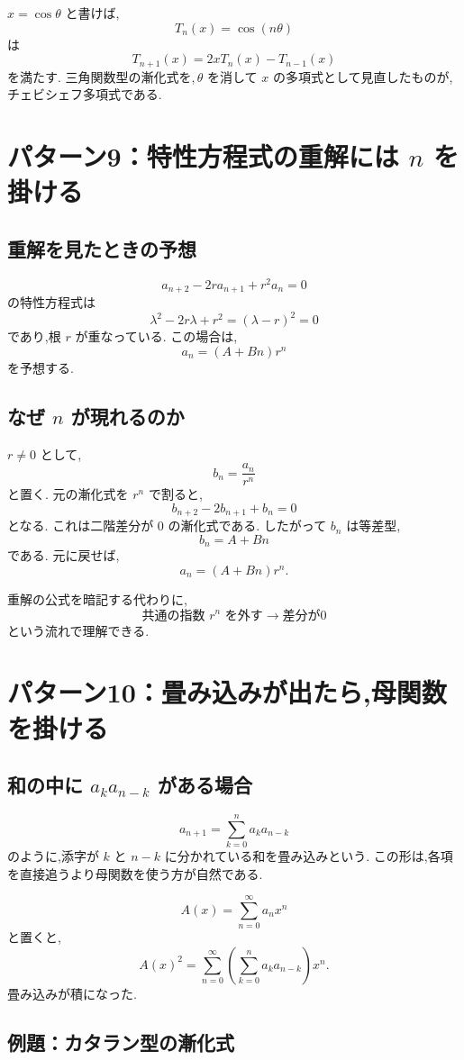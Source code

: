 $x=\cos\theta$ と書けば,
\[
  T_n(x)=\cos(n\theta)
\]
は
\[
  T_{n+1}(x)=2xT_n(x)-T_{n-1}(x)
\]
を満たす.
三角関数型の漸化式を,\,$\theta$ を消して $x$ の多項式として見直したものが,
チェビシェフ多項式である.

\section{パターン9：特性方程式の重解には $n$ を掛ける}

\subsection{重解を見たときの予想}

\[
  a_{n+2}-2r a_{n+1}+r^2a_n=0
\]
の特性方程式は
\[
  \lambda^2-2r\lambda+r^2=(\lambda-r)^2=0
\]
であり,根 $r$ が重なっている.
この場合は,
\[
  a_n=(A+Bn)r^n
\]
を予想する.

\subsection{なぜ $n$ が現れるのか}

$r\neq0$ として,
\[
  b_n=\frac{a_n}{r^n}
\]
と置く.
元の漸化式を $r^{n}$ で割ると,
\[
  b_{n+2}-2b_{n+1}+b_n=0
\]
となる.
これは二階差分が $0$ の漸化式である.
したがって $b_n$ は等差型,
\[
  b_n=A+Bn
\]
である.
元に戻せば,
\[
  a_n=(A+Bn)r^n.
\]

重解の公式を暗記する代わりに,
\[
  \text{共通の指数 }r^n\text{ を外す}
  \longrightarrow
  \text{差分が0}
\]
という流れで理解できる.

\section{パターン10：畳み込みが出たら,母関数を掛ける}

\subsection{和の中に $a_ka_{n-k}$ がある場合}

\[
  a_{n+1}=\sum_{k=0}^{n}a_ka_{n-k}
\]
のように,添字が $k$ と $n-k$ に分かれている和を畳み込みという.
この形は,各項を直接追うより母関数を使う方が自然である.

\[
  A(x)=\sum_{n=0}^{\infty}a_nx^n
\]
と置くと,
\[
  A(x)^2
  =\sum_{n=0}^{\infty}
    \left(\sum_{k=0}^{n}a_ka_{n-k}\right)x^n.
\]
畳み込みが積になった.

\subsection{例題：カタラン型の漸化式}

